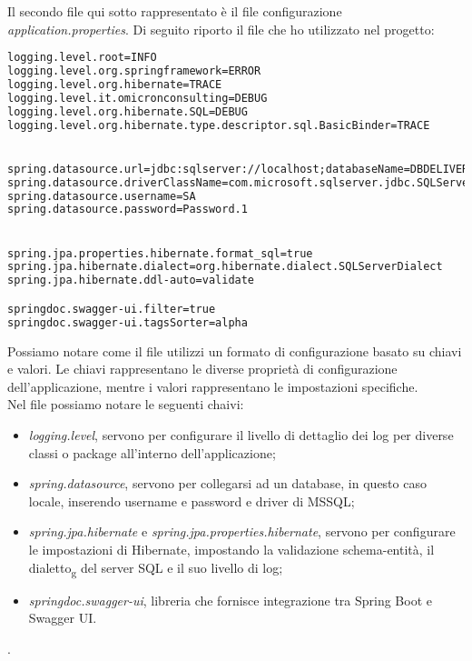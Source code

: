 \noindent Il secondo file qui sotto rappresentato è il file configurazione \textit{application.properties}. Di seguito riporto il file che ho utilizzato nel progetto:
\begin{lstlisting}[language = XML, caption = application.properties del progetto]
logging.level.root=INFO
logging.level.org.springframework=ERROR
logging.level.org.hibernate=TRACE
logging.level.it.omicronconsulting=DEBUG
logging.level.org.hibernate.SQL=DEBUG
logging.level.org.hibernate.type.descriptor.sql.BasicBinder=TRACE


spring.datasource.url=jdbc:sqlserver://localhost;databaseName=DBDELIVERONE;Trusted_Connection=False;\MultipleActiveResultSets=true;encrypt=true;trustServerCertificate=true;
spring.datasource.driverClassName=com.microsoft.sqlserver.jdbc.SQLServerDriver
spring.datasource.username=SA
spring.datasource.password=Password.1


spring.jpa.properties.hibernate.format_sql=true
spring.jpa.hibernate.dialect=org.hibernate.dialect.SQLServerDialect
spring.jpa.hibernate.ddl-auto=validate

springdoc.swagger-ui.filter=true
springdoc.swagger-ui.tagsSorter=alpha
\end{lstlisting}
Possiamo notare come il file utilizzi un formato di configurazione basato su chiavi e valori. Le chiavi rappresentano le diverse proprietà di configurazione dell'applicazione, mentre i valori rappresentano le impostazioni specifiche.\\
Nel file possiamo notare le seguenti chaivi:
\begin{itemize}
\item \textit{logging.level}, servono per configurare il livello di dettaglio dei log per diverse classi o package all'interno dell'applicazione;
\item \textit{spring.datasource}, servono per collegarsi ad un database, in questo caso locale, inserendo username e password e driver di MSSQL;
\item \textit{spring.jpa.hibernate} e \textit{spring.jpa.properties.hibernate}, servono per configurare le impostazioni di Hibernate, impostando la validazione schema-entità, il dialetto\textsubscript{g} del server SQL e il suo livello di log;
\item \textit{springdoc.swagger-ui}, libreria che fornisce integrazione tra Spring Boot e Swagger UI.  
\end{itemize}. 